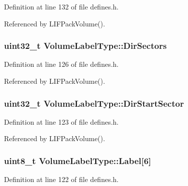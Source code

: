 Definition at line 132 of file defines.\+h.



Referenced by L\+I\+F\+Pack\+Volume().

\subsubsection[{\texorpdfstring{Dir\+Sectors}{DirSectors}}]{\setlength{\rightskip}{0pt plus 5cm}uint32\+\_\+t Volume\+Label\+Type\+::\+Dir\+Sectors}\hypertarget{structVolumeLabelType_a11e35931a035c61cddc1fa20898e9466}{}\label{structVolumeLabelType_a11e35931a035c61cddc1fa20898e9466}


Definition at line 126 of file defines.\+h.



Referenced by L\+I\+F\+Pack\+Volume().

\subsubsection[{\texorpdfstring{Dir\+Start\+Sector}{DirStartSector}}]{\setlength{\rightskip}{0pt plus 5cm}uint32\+\_\+t Volume\+Label\+Type\+::\+Dir\+Start\+Sector}\hypertarget{structVolumeLabelType_aa74d0d5a4d248e42b2eb2fb95dcad4a6}{}\label{structVolumeLabelType_aa74d0d5a4d248e42b2eb2fb95dcad4a6}


Definition at line 123 of file defines.\+h.



Referenced by L\+I\+F\+Pack\+Volume().

\subsubsection[{\texorpdfstring{Label}{Label}}]{\setlength{\rightskip}{0pt plus 5cm}uint8\+\_\+t Volume\+Label\+Type\+::\+Label\mbox{[}6\mbox{]}}\hypertarget{structVolumeLabelType_ad8724768576a8eb4d697597ae9b90c21}{}\label{structVolumeLabelType_ad8724768576a8eb4d697597ae9b90c21}


Definition at line 122 of file defines.\+h.



